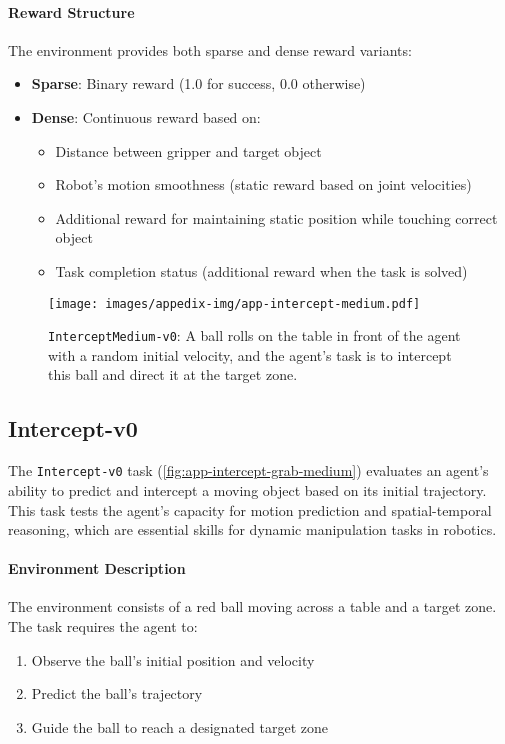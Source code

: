 \paragraph{Reward Structure} The environment provides both sparse and dense reward variants:
\begin{itemize}
    \item \textbf{Sparse}: Binary reward (1.0 for success, 0.0 otherwise)
    \item \textbf{Dense}: Continuous reward based on:
    \begin{itemize}
        \item Distance between gripper and target object
        \item Robot's motion smoothness (static reward based on joint velocities)
        \item Additional reward for maintaining static position while touching correct object
        \item Task completion status (additional reward when the task is solved)
    \end{itemize}
\end{itemize}


\newpage
\begin{figure*}[h!]
    \centering
    \texttt{[image: images/appedix-img/app-intercept-medium.pdf]}
    \vspace{-15pt}
    \caption{\texttt{InterceptMedium-v0}: A ball rolls on the table in front of the agent with a random initial velocity, and the agent's task is to intercept this ball and direct it at the target zone.}
    \label{fig:app-intercept-medium}
    \vspace{-15pt}
\end{figure*}
\subsection{Intercept-v0}
\label{app:intercept}

The \texttt{Intercept-v0} task (\autoref{fig:app-intercept-grab-medium}) evaluates an agent's ability to predict and intercept a moving object based on its initial trajectory. This task tests the agent's capacity for motion prediction and spatial-temporal reasoning, which are essential skills for dynamic manipulation tasks in robotics.

\paragraph{Environment Description} The environment consists of a red ball moving across a table and a target zone. The task requires the agent to:
\begin{enumerate}
    \item Observe the ball's initial position and velocity
    \item Predict the ball's trajectory
    \item Guide the ball to reach a designated target zone
\end{enumerate}

